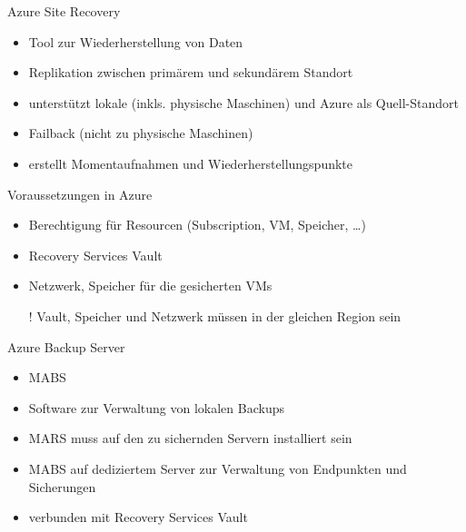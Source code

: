 
\begin{flashcard}[Definition]{Azure Site Recovery}
  \begin{itemize}
    \item Tool zur Wiederherstellung von Daten
    \item Replikation zwischen primärem und sekundärem Standort
    \item unterstützt lokale (inkls. physische Maschinen) und Azure als Quell-Standort
    \item Failback (nicht zu physische Maschinen)
    \item erstellt Momentaufnahmen und Wiederherstellungspunkte
  \end{itemize}
\end{flashcard}

\begin{flashcard}[Definition]{Voraussetzungen in Azure}
  \begin{itemize}
    \item Berechtigung für Resourcen (Subscription, VM, Speicher, \ldots)
    \item Recovery Services Vault
    \item Netzwerk, Speicher für die gesicherten VMs
    \item[!] Vault, Speicher und Netzwerk müssen in der gleichen Region sein
  \end{itemize}
\end{flashcard}

\begin{flashcard}[Definition]{Azure Backup Server}
  \begin{itemize}
    \item MABS
    \item Software zur Verwaltung von lokalen Backups
    \item MARS muss auf den zu sichernden Servern installiert sein
    \item MABS auf dediziertem Server zur Verwaltung von Endpunkten und Sicherungen
    \item verbunden mit Recovery Services Vault
  \end{itemize}
\end{flashcard}

